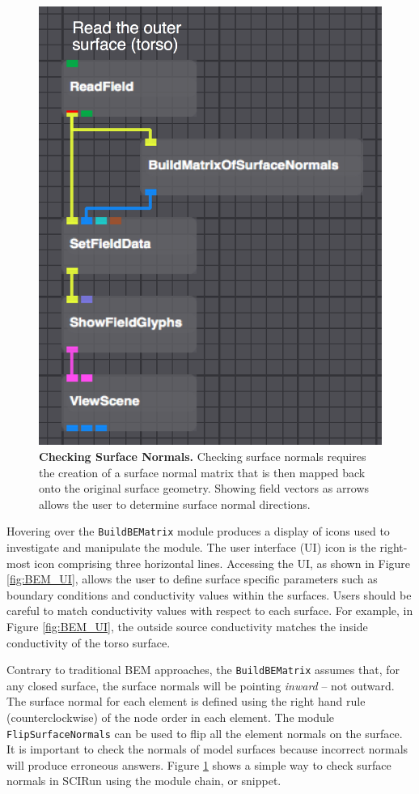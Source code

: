 \begin{figure}
\begin{center}
\includegraphics[width=.45\textwidth]{ECGToolkitGuide_figures/CheckSurfaceNormals.png}
\caption{{\bf Checking Surface Normals.} Checking surface normals requires the creation of a surface normal matrix that is then mapped back onto the original surface geometry. Showing field vectors as arrows allows the user to determine surface normal directions.}
\label{fig:CheckNormals}
\end{center}
\vspace{-.25in}
\end{figure}

Hovering over the {\tt BuildBEMatrix} module produces a display of icons used to investigate and manipulate the module.
The user interface (UI) icon is the right-most icon comprising three horizontal lines.
Accessing the UI, as shown in Figure \ref{fig:BEM_UI}, allows the user to define surface specific parameters such as boundary conditions and conductivity values within the surfaces.
Users should be careful to match conductivity values with respect to each surface.
For example, in Figure \ref{fig:BEM_UI}, the outside source conductivity matches the inside conductivity of the torso surface.

Contrary to traditional BEM approaches, the {\tt BuildBEMatrix} assumes that, for any closed surface, the surface normals will be pointing {\em inward} -- not outward. The surface
normal for each element is defined using the right hand rule (counterclockwise) of the node order in each element.
The module {\tt FlipSurfaceNormals} can be used to flip all the element normals on the surface.
It is important to check
the normals of model surfaces because incorrect normals will produce erroneous answers.
Figure \ref{fig:CheckNormals} shows a simple way to check surface normals in SCIRun using the module chain, or snippet.

